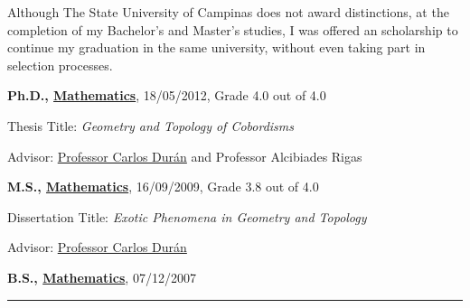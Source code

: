 \documentclass[10pt]{article}
\newenvironment{outerlist}[1][\enskip\textbullet]%
{\begin{itemize}[#1]}{\end{itemize}%
	\vspace{-.6\baselineskip}}
\newenvironment{innerlist}[1][\enskip\textbullet]%
{\begin{compactitem}[#1]}{\end{compactitem}}
\newcommand{\blankline}{\quad\pagebreak[2]}
\begin{document}
	Although The State University of Campinas does not award distinctions, at the completion  of my Bachelor's and Master's studies, I was offered an scholarship to continue my graduation in the same university, without even taking part in selection processes.
	
	\vspace{0.5em}
	

	\vspace{-0.5em}
	\begin{outerlist}
		
		\item[] \textbf{Ph.D.,
			\href{http://www.ime.unicamp.br/}
			{Mathematics}},
		18/05/2012, Grade 4.0 out of 4.0
		\begin{innerlist} \vspace{-0.4em}
			
			\item[] Thesis Title: \emph{Geometry and Topology of Cobordisms}
			\item[] Advisor:
			\href{http://lattes.cnpq.br/2287909020835559}
			{Professor Carlos Durán} and Professor Alcibiades Rigas         \end{innerlist}
		
		\vspace{-0.3em}
		
		\item[]\textbf{M.S.,
			\href{http://www.ime.unicamp.br/}
			{Mathematics}}, 16/09/2009, Grade 3.8 out of 4.0
		\begin{innerlist}\vspace{-0.4em}
			
			\item[] Dissertation Title: \emph{Exotic Phenomena in Geometry and Topology}
			\item[] Advisor:
			\href{http://lattes.cnpq.br/2287909020835559}
			{Professor Carlos Durán} 
		\end{innerlist}
		
		\vspace{-0.3em}
		
		\item[] \textbf{B.S.,
			\href{http://www.ime.unicamp.br/}
			{Mathematics}}, 07/12/2007
	\end{outerlist}
	
	
	
	
	
	\rule{\columnwidth}{.5pt}%
	
	\vspace{-1em}
	
\end{document}
